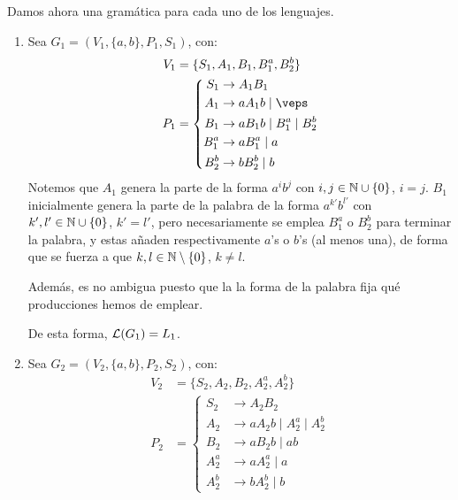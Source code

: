 \begin{ejercicio}
    Damos ahora una gramática para cada uno de los lenguajes.
    \begin{enumerate}
        \item Sea $G_1=(V_1,\{a,b\},P_1,S_1)$, con:
        \begin{equation*}
            \begin{aligned}
                V_1 &= \{ S_1, A_1, B_1, B_1^a, B_2^b \} \\
                P_1 &= \left\{
                    \begin{aligned}
                        S_1 &\rightarrow A_1B_1 \\
                        A_1 &\rightarrow aA_1b \mid \veps \\
                        B_1 &\rightarrow aB_1b \mid B_1^a \mid B_2^b \\
                        B_1^a &\rightarrow aB_1^a \mid a \\
                        B_2^b &\rightarrow bB_2^b \mid b
                    \end{aligned}
                \right.
            \end{aligned}
        \end{equation*}
        Notemos que $A_1$ genera la parte de la forma $a^ib^j$ con $i,j\in \mathbb{N}\cup \{0\}$, $i=j$. $B_1$ inicialmente genera la parte de la palabra de la forma $a^{k'}b^{l'}$ con $k',l'\in \mathbb{N}\cup \{0\}$, $k'=l'$, pero necesariamente se emplea $B_1^a$ o $B_2^b$ para terminar la palabra, y estas añaden respectivamente $a$'s o $b$'s (al menos una), de forma que se fuerza a que $k,l\in \mathbb{N}\setminus \{0\}$, $k\neq l$.

        Además, es no ambigua puesto que la la forma de la palabra fija qué producciones hemos de emplear.

        De esta forma, $\mathcal{L}(G_1)=L_1$.

        \item Sea $G_2=(V_2,\{a,b\},P_2,S_2)$, con:
        \begin{equation*}
            \begin{aligned}
                V_2 &= \{ S_2, A_2, B_2, A_2^a, A_2^b \} \\
                P_2 &= \left\{
                    \begin{aligned}
                        S_2 &\rightarrow A_2B_2 \\
                        A_2 &\rightarrow aA_2b \mid A_2^a \mid A_2^b \\
                        B_2 &\rightarrow aB_2b \mid ab \\
                        A_2^a &\rightarrow aA_2^a \mid a \\
                        A_2^b &\rightarrow bA_2^b \mid b
                    \end{aligned}
                \right.
            \end{aligned}
        \end{equation*}


\end{enumerate}
\end{ejercicio}

